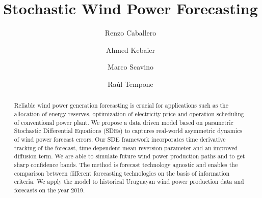 \documentclass[11pt]{article}
\theoremstyle{definition}
\begin{document}
\title{ Stochastic Wind Power Forecasting }  %

\author[1]{Renzo Caballero}
\author[2]{Ahmed Kebaier}
\author[3]{Marco Scavino}
\author[4]{ Ra\'ul  Tempone}


\maketitle


\begin{abstract}

Reliable wind power generation forecasting is crucial for applications such as the allocation of energy reserves, optimization of electricity price and operation scheduling of conventional power plant. We propose a data driven model based on parametric Stochastic Differential Equations (SDEs) to captures real-world asymmetric dynamics of wind power forecast errors. Our SDE framework incorporates time derivative tracking of the forecast, time-dependent mean reversion parameter and an improved diffusion term. We are able to simulate future wind power production paths and to get sharp confidence bands. The method is forecast technology agnostic and enables the comparison between different forecasting technologies on the basis of information criteria. We apply the model to historical Uruguayan wind power production data and forecasts on the year 2019.

\end{abstract}
\end{document}
